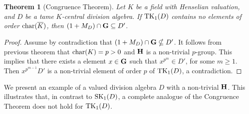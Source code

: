 \documentclass{amsart}
\newtheorem{theorem}{Theorem}
\theoremstyle{definition}
\numberwithin{equation}{section} %
\begin{document}
\begin{theorem}[Congruence Theorem]\label{corollary_in_D'}
	Let $K$ be a field with Henselian valuation, and $D$ be a tame $K$-central division algebra. If ${\rm TK}_1(D)$ contains no elements of order ${\rm char}(\overline{K})$, then $(1+M_D) \cap {\bf G} \subseteq D'$.
\end{theorem}
\begin{proof}
	Assume by contradiction that $(1+M_D) \cap {\bf G} \nsubseteq D'$. It follows from previous theorem that ${\rm char}(K)=p>0$ and ${\bf H}$ is a non-trivial $p$-group. This implies that there exists a element $x\in {\bf G}$ such that  $x^{p^m}\in D'$, for some $m\geq 1$. Then $x^{p^{m-1}}D'$ is a non-trivial element of order $p$ of ${\rm TK}_1(D)$, a contradiction. 
\end{proof}

We present an example of a valued division algebra \(D\) with a non-trivial \({\bf H}\). This illustrates that, in contrast to \({\rm SK}_1(D)\), a complete analogue of the Congruence Theorem does not hold for \({\rm TK}_1(D)\).
\end{document}
